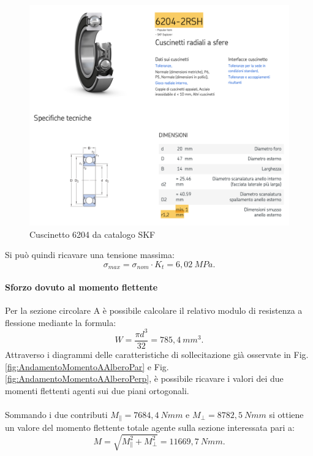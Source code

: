 \begin{figure}[h]
    \centering
    \includegraphics[scale=0.3]{Immagini/Cuscinetto6204.png}
    \caption{Cuscinetto 6204 da catalogo SKF}
    \label{fig:Cuscinetto6204}
\end{figure}

Si può quindi ricavare una tensione massima:
\begin{equation}
    \sigma_{max}=\sigma_{nom}\cdot K_t=6,02\ MPa.
\end{equation}
\paragraph{Sforzo dovuto al momento flettente}
Per la sezione circolare A è possibile calcolare il relativo modulo di resistenza a flessione mediante la formula:
\begin{equation}
    W=\frac{\pi d^3}{32}=785,4\ mm^3.
    \label{W_A}
\end{equation}
Attraverso i diagrammi delle caratteristiche di sollecitazione già osservate in Fig.\ref{fig:AndamentoMomentoAAlberoPar} e Fig.\ref{fig:AndamentoMomentoAAlberoPerp}, è possibile ricavare i valori dei due momenti flettenti agenti sui due piani ortogonali.\\ 
\\
Sommando i due contributi $M_{\parallel}=7684,4\ Nmm$ e $M_{\perp}=8782,5\ Nmm$ si ottiene un valore del momento flettente totale agente sulla sezione interessata pari a:
\begin{equation}
    M=\sqrt{M_{\parallel}^2+M_{\perp}^2}=11669,7\ Nmm.
\end{equation}


